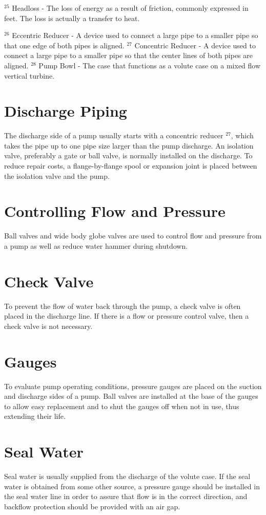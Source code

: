 \documentclass[10pt]{article}
\begin{document}
${ }^{25}$ Headloss - The loss of energy as a result of friction, commonly expressed in feet. The loss is actually a transfer to heat.

${ }^{26}$ Eccentric Reducer - A device used to connect a large pipe to a smaller pipe so that one edge of both pipes is aligned. ${ }^{27}$ Concentric Reducer - A device used to connect a large pipe to a smaller pipe so that the center lines of both pipes are aligned. ${ }^{28}$ Pump Bowl - The case that functions as a volute case on a mixed flow vertical turbine.

\section{Discharge Piping}
The discharge side of a pump usually starts with a concentric reducer ${ }^{27}$, which takes the pipe up to one pipe size larger than the pump discharge. An isolation valve, preferably a gate or ball valve, is normally installed on the discharge. To reduce repair costs, a flange-by-flange spool or expansion joint is placed between the isolation valve and the pump.

\section{Controlling Flow and Pressure}
Ball valves and wide body globe valves are used to control flow and pressure from a pump as well as reduce water hammer during shutdown.

\section{Check Valve}
To prevent the flow of water back through the pump, a check valve is often placed in the discharge line. If there is a flow or pressure control valve, then a check valve is not necessary.

\section{Gauges}
To evaluate pump operating conditions, pressure gauges are placed on the suction and discharge sides of a pump. Ball valves are installed at the base of the gauges to allow easy replacement and to shut the gauges off when not in use, thus extending their life.

\section{Seal Water}
Seal water is usually supplied from the discharge of the volute case. If the seal water is obtained from some other source, a pressure gauge should be installed in the seal water line in order to assure that flow is in the correct direction, and backflow protection should be provided with an air gap.
\end{document}
